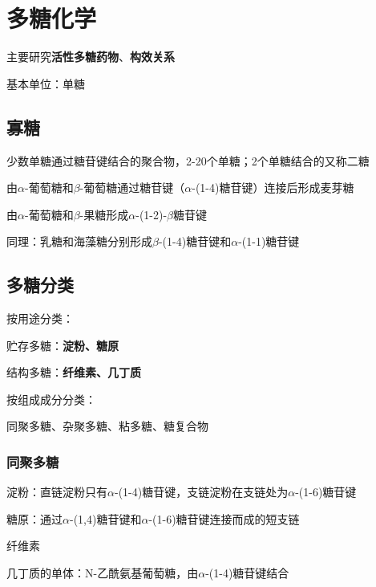 \section{多糖化学}%
\label{sec:多糖化学}
主要研究\textbf{活性多糖药物}、\textbf{构效关系}
\begin{notation}
基本单位：单糖
\end{notation}
\subsection{寡糖}%
\label{sub:寡糖}
\begin{defi}
    少数单糖通过糖苷键结合的聚合物，2-20个单糖；2个单糖结合的又称二糖
\end{defi}
\begin{eg}
    由$\alpha$-葡萄糖和$\beta$-葡萄糖通过糖苷键（$\alpha$-(1-4)糖苷键）连接后形成麦芽糖
\end{eg}
\begin{eg}
由$\alpha$-葡萄糖和$\beta$-果糖形成$\alpha$-(1-2)-$\beta$糖苷键
\end{eg}
同理：乳糖和海藻糖分别形成$\beta$-(1-4)糖苷键和$\alpha$-(1-1)糖苷键
\subsection{多糖分类}%
\label{sub:多糖分类}
按用途分类：
\begin{notation}
贮存多糖：\textbf{淀粉、糖原}

结构多糖：\textbf{纤维素、几丁质}
\end{notation}
按组成成分分类：
\begin{notation}
    同聚多糖、杂聚多糖、粘多糖、糖复合物
\end{notation}
\subsubsection*{同聚多糖}%
\label{subsub*:同聚多糖}
\begin{eg}
    淀粉：直链淀粉只有$\alpha$-(1-4)糖苷键，支链淀粉在支链处为$\alpha$-(1-6)糖苷键
\end{eg}
\begin{eg}
糖原：通过$\alpha$-(1,4)糖苷键和$\alpha$-(1-6)糖苷键连接而成的短支链
\end{eg}
\begin{eg}
    纤维素
\end{eg}
\begin{eg}
几丁质的单体：N-乙酰氨基葡萄糖，由$\alpha$-(1-4)糖苷键结合
\end{eg}

